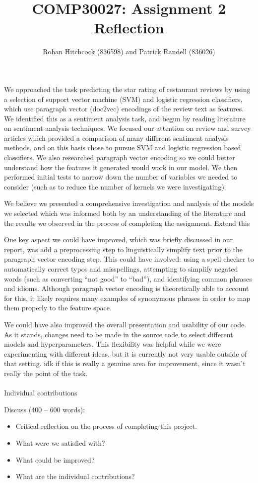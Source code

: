 \documentclass[11pt]{article}
\newcommand{\drafting}[1]{\textcolor{OliveGreen}{#1}}
\begin{document}
\title{\textbf{COMP30027: Assignment 2 Reflection}}
\author{Rohan Hitchcock (836598) and Patrick Randell (836026)}
\date{}
\maketitle

We approached the task predicting the star rating of restaurant reviews by using a selection of support vector machine (SVM) and logistic regression classifiers, which use paragraph vector (doc2vec) encodings of the review text as features. We identified this as a sentiment analysis task, and begun by reading literature on sentiment analysis techniques. We focused our attention on review and survey articles which provided a comparison of many different sentiment analysis methods, and on this basis chose to pursue SVM and logistic regression based classifiers. We also researched paragraph vector encoding so we could better understand how the features it generated would work in our model. We then performed initial tests to narrow down the number of variables we needed to consider (such as to reduce the number of kernels we were investigating).

We believe we presented a comprehensive investigation and analysis of the models we selected which was informed both by an understanding of the literature and the results we observed in the process of completing the assignment. \drafting{Extend this}

One key aspect we could have improved, which was briefly discussed in our report, was add a preprocessing step to linguistically simplify text prior to the paragraph vector encoding step. This could have involved: using a spell checker to automatically correct typos and misspellings, attempting to simplify negated words (such as converting ``not good'' to ``bad''), and identifying common phrases and idioms. Although paragraph vector encoding is theoretically able to account for this, it likely requires many examples of synonymous phrases in order to map them properly to the feature space.

We could have also improved the overall presentation and usability of our code. As it stands, changes need to be made in the source code to select different models and hyperparameters. This flexibility was helpful while we were experimenting with different ideas, but it is currently not very usable outside of that setting. \drafting{idk if this is really a genuine area for improvement, since it wasn't really the point of the task.}
\\
\\
\drafting{Individual contributions}
\\

\drafting{ Discuss (400 -- 600 words):
\begin{itemize}
    \item Critical reflection on the process of completing this project.
    \item What were we satisfied with?
    \item What could be improved?
    \item What are the individual contributions?
\end{itemize}
}
\end{document}
